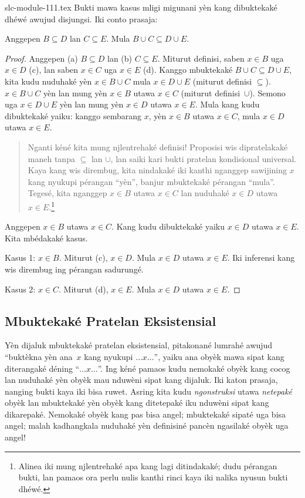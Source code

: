 \begin{filecontents*}[overwrite]{slc-module-111.tex}
Bukti mawa kasus mligi migunani yèn kang dibuktekaké dhéwé
awujud disjungsi. Iki conto prasaja:

\begin{prop}
Anggepen $B \subseteq D$ lan $C \subseteq E$.
Mula $B \cup C \subseteq D \cup E$.
\end{prop}

\begin{proof}
  Anggepen (a) $B \subseteq D$ lan (b) $C \subseteq E$.
  Miturut definisi, saben $x \in B$ uga $x \in D$ (c),
  lan saben $x \in C$ uga $x \in E$ (d).
  Kanggo mbuktekaké $B \cup C \subseteq D \cup E$, kita
  kudu nuduhaké yèn $x \in B \cup C$ mula $x \in D \cup E$
  (miturut definisi $\subseteq$). $x \in B \cup C$ yèn
  lan mung yèn $x \in B$ utawa $x \in C$ (miturut definisi~$\cup$).
  Semono uga $x \in D \cup E$ yèn lan mung yèn $x \in D$
  utawa $x \in E$. Mula kang kudu dibuktekaké yaiku:
  kanggo sembarang $x$, yèn $x \in B$ utawa $x \in C$,
  mula $x \in D$ utawa $x \in E$.

  \begin{quote}
  Nganti kéné kita mung njlentrehaké definisi!{} Proposisi wis
  dipratelakaké maneh tanpa $\subseteq$ lan $\cup$, lan saiki
  kari bukti pratelan kondisional universal. Kaya kang wis dirembug,
  kita nindakaké iki kanthi nganggep sawijining $x$ kang nyukupi
  pérangan ``yèn'', banjur mbuktekaké pérangan ``mula''.
  Tegesé, kita nganggep $x \in B$ utawa $x \in C$ lan
  nuduhaké $x \in D$ utawa $x \in E$.\footnote{Alinea iki mung
  njlentrehaké apa kang lagi ditindakaké; dudu pérangan bukti,
  lan pamaos ora perlu nulis kanthi rinci kaya iki nalika
  nyusun bukti dhéwé.}
  \end{quote}

  Anggepen $x \in B$ utawa $x \in C$. Kang kudu dibuktekaké
  yaiku $x \in D$ utawa $x \in E$. Kita mbédakaké kasus.

  Kasus 1: $x \in B$. Miturut (c), $x \in D$. Mula $x \in D$
  utawa $x \in E$. Iki inferensi kang wis dirembug ing
  pérangan sadurungé.

  Kasus 2: $x \in C$. Miturut (d), $x \in E$. Mula $x \in D$
  utawa $x \in E$.
\end{proof}

\subsection{Mbuktekaké Pratelan Eksistensial}

Yèn dijaluk mbuktekaké pratelan eksistensial, pitakonané lumrahé
awujud ``buktèkna yèn ana~$x$ kang nyukupi $\dots x \dots$'',
yaiku ana obyèk mawa sipat kang diterangaké déning ``$\dots x
\dots$''. Ing kéné pamaos kudu nemokaké obyèk kang cocog
lan nuduhaké yèn obyèk mau nduwèni sipat kang dijaluk.
Iki katon prasaja, nanging bukti kaya iki bisa ruwet. Asring
kita kudu \emph{ngonstruksi} utawa \emph{netepaké} obyèk
lan mbuktekaké yèn obyèk kang ditetepaké iku nduwèni
sipat kang dikarepaké. Nemokaké obyèk kang pas bisa angel;
mbuktekaké sipaté uga bisa angel; malah kadhangkala nuduhaké
yèn definisiné pancèn ngasilaké obyèk uga angel!{}


\end{filecontents*}
